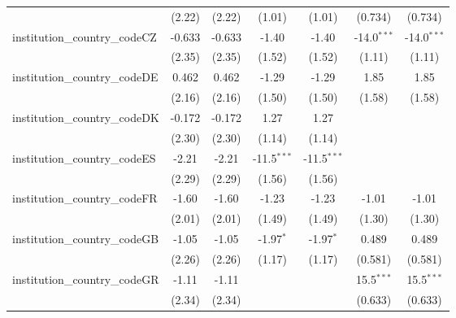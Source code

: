 \begin{tabular}{lcccccc}
                                         & (2.22)        & (2.22)        & (1.01)        & (1.01)        & (0.734)       & (0.734)\\   
   institution\_country\_codeCZ          & -0.633        & -0.633        & -1.40         & -1.40         & -14.0$^{***}$ & -14.0$^{***}$\\   
                                         & (2.35)        & (2.35)        & (1.52)        & (1.52)        & (1.11)        & (1.11)\\   
   institution\_country\_codeDE          & 0.462         & 0.462         & -1.29         & -1.29         & 1.85          & 1.85\\   
                                         & (2.16)        & (2.16)        & (1.50)        & (1.50)        & (1.58)        & (1.58)\\   
   institution\_country\_codeDK          & -0.172        & -0.172        & 1.27          & 1.27          &               &   \\   
                                         & (2.30)        & (2.30)        & (1.14)        & (1.14)        &               &   \\   
   institution\_country\_codeES          & -2.21         & -2.21         & -11.5$^{***}$ & -11.5$^{***}$ &               &   \\   
                                         & (2.29)        & (2.29)        & (1.56)        & (1.56)        &               &   \\   
   institution\_country\_codeFR          & -1.60         & -1.60         & -1.23         & -1.23         & -1.01         & -1.01\\   
                                         & (2.01)        & (2.01)        & (1.49)        & (1.49)        & (1.30)        & (1.30)\\   
   institution\_country\_codeGB          & -1.05         & -1.05         & -1.97$^{*}$   & -1.97$^{*}$   & 0.489         & 0.489\\   
                                         & (2.26)        & (2.26)        & (1.17)        & (1.17)        & (0.581)       & (0.581)\\   
   institution\_country\_codeGR          & -1.11         & -1.11         &               &               & 15.5$^{***}$  & 15.5$^{***}$\\   
                                         & (2.34)        & (2.34)        &               &               & (0.633)       & (0.633)\\   

\end{tabular}
